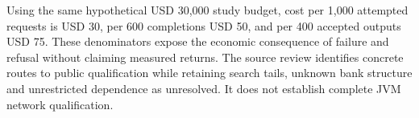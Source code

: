 Using the same hypothetical USD 30,000 study budget, cost per 1,000 attempted requests is USD 30, per 600 completions USD 50, and per 400 accepted outputs USD 75. These denominators expose the economic consequence of failure and refusal without claiming measured returns. The source review identifies concrete routes to public qualification while retaining search tails, unknown bank structure and unrestricted dependence as unresolved. It does not establish complete JVM network qualification.~\citep{exec25_jnet_choice}
